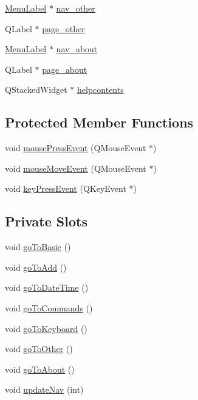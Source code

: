 \begin{DoxyCompactItemize}
\item 
\hyperlink{class_do_lah_1_1_menu_label}{Menu\+Label} $\ast$ \hyperlink{class_do_lah_1_1_help_window_af1fe46b47e8902a98d24bfa31c0895bf}{nav\+\_\+other}
\item 
Q\+Label $\ast$ \hyperlink{class_do_lah_1_1_help_window_ae95510d5027171260f759d7b7645cf04}{page\+\_\+other}
\item 
\hyperlink{class_do_lah_1_1_menu_label}{Menu\+Label} $\ast$ \hyperlink{class_do_lah_1_1_help_window_a1a825a6344e3dd0eaf173bd4a13b27ff}{nav\+\_\+about}
\item 
Q\+Label $\ast$ \hyperlink{class_do_lah_1_1_help_window_a9b78256dc44af082cdbf1d1f30288b1b}{page\+\_\+about}
\item 
Q\+Stacked\+Widget $\ast$ \hyperlink{class_do_lah_1_1_help_window_a69e827d524d1087a8c5328ca03074801}{helpcontents}
\end{DoxyCompactItemize}
\subsection*{Protected Member Functions}
\begin{DoxyCompactItemize}
\item 
void \hyperlink{class_do_lah_1_1_help_window_a923edaa7d41c7fcb7eca0b96b91c0595}{mouse\+Press\+Event} (Q\+Mouse\+Event $\ast$)
\item 
void \hyperlink{class_do_lah_1_1_help_window_ad80f04642df35d83adb32fb59b8145c3}{mouse\+Move\+Event} (Q\+Mouse\+Event $\ast$)
\item 
void \hyperlink{class_do_lah_1_1_help_window_a484d39bdf36f662a56cdf7d4882de138}{key\+Press\+Event} (Q\+Key\+Event $\ast$)
\end{DoxyCompactItemize}
\subsection*{Private Slots}
\begin{DoxyCompactItemize}
\item 
void \hyperlink{class_do_lah_1_1_help_window_ac3bcf4d7d645bfb6c05084360830af85}{go\+To\+Basic} ()
\item 
void \hyperlink{class_do_lah_1_1_help_window_a8cbdde25f84ef4ae43dd679d3e86e464}{go\+To\+Add} ()
\item 
void \hyperlink{class_do_lah_1_1_help_window_a4fe0ff0617ae3ccddb0da79b7de47b88}{go\+To\+Date\+Time} ()
\item 
void \hyperlink{class_do_lah_1_1_help_window_aea7d4ad24e370760848775966abd8a06}{go\+To\+Commands} ()
\item 
void \hyperlink{class_do_lah_1_1_help_window_a5261630cec18634e4171b229d98e1332}{go\+To\+Keyboard} ()
\item 
void \hyperlink{class_do_lah_1_1_help_window_a110ac778fedabbd32a8f6c0458086021}{go\+To\+Other} ()
\item 
void \hyperlink{class_do_lah_1_1_help_window_a7b97468dfef0a46811d85e04b75745b5}{go\+To\+About} ()
\item 
void \hyperlink{class_do_lah_1_1_help_window_a92263afa324bb27ca9cedc47a8d2652c}{update\+Nav} (int)
\end{DoxyCompactItemize}
